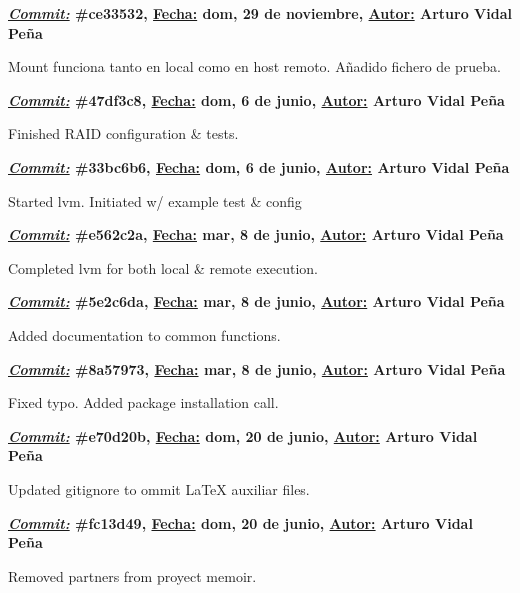 \item \textbf{\underline{\textit{Commit:}} \#ce33532, \underline{Fecha:} dom, 29 de noviembre, \underline{Autor:} Arturo Vidal Peña}\\\item[] Mount funciona tanto en local como en host remoto. Añadido fichero de prueba.\\
\item \textbf{\underline{\textit{Commit:}} \#47df3c8, \underline{Fecha:} dom,  6 de junio, \underline{Autor:} Arturo Vidal Peña}\\\item[] Finished RAID configuration \& tests.\\
\item \textbf{\underline{\textit{Commit:}} \#33bc6b6, \underline{Fecha:} dom,  6 de junio, \underline{Autor:} Arturo Vidal Peña}\\\item[] Started lvm. Initiated w/ example test \& config\\
\item \textbf{\underline{\textit{Commit:}} \#e562c2a, \underline{Fecha:} mar,  8 de junio, \underline{Autor:} Arturo Vidal Peña}\\\item[] Completed lvm for both local \& remote execution.\\
\item \textbf{\underline{\textit{Commit:}} \#5e2c6da, \underline{Fecha:} mar,  8 de junio, \underline{Autor:} Arturo Vidal Peña}\\\item[] Added documentation to common functions.\\
\item \textbf{\underline{\textit{Commit:}} \#8a57973, \underline{Fecha:} mar,  8 de junio, \underline{Autor:} Arturo Vidal Peña}\\\item[] Fixed typo. Added package installation call.\\
\item \textbf{\underline{\textit{Commit:}} \#e70d20b, \underline{Fecha:} dom, 20 de junio, \underline{Autor:} Arturo Vidal Peña}\\\item[] Updated gitignore to ommit LaTeX auxiliar files.\\
\item \textbf{\underline{\textit{Commit:}} \#fc13d49, \underline{Fecha:} dom, 20 de junio, \underline{Autor:} Arturo Vidal Peña}\\\item[] Removed partners from proyect memoir.\\
